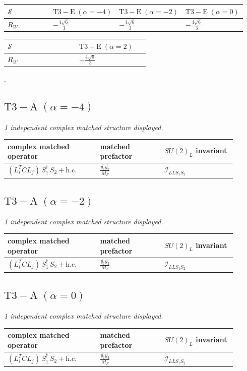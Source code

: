 \documentclass[9pt]{article}
\begin{document}
\begin{longtable}{@{}p{0.37\linewidth}p{0.19\linewidth}p{0.19\linewidth}p{0.19\linewidth}@{}}
\toprule
$\mathcal{S}$ & $ \mathrm{T3-E}\;(\alpha=-4) $ & $ \mathrm{T3-E}\;(\alpha=-2) $ & $ \mathrm{T3-E}\;(\alpha=0) $ \\
\midrule
$R_W$ & $ - \frac{4 \sqrt{6}}{3} $ & $ - \frac{4 \sqrt{6}}{3} $ & $ - \frac{4 \sqrt{6}}{3} $ \\
\bottomrule
\end{longtable}
\begin{longtable}{@{}p{0.37\linewidth}p{0.19\linewidth}@{}}
\toprule
$\mathcal{S}$ & $ \mathrm{T3-E}\;(\alpha=2) $ \\
\midrule
$R_W$ & $ - \frac{4 \sqrt{6}}{3} $ \\
\bottomrule
\end{longtable}
.
\subsection*{$ \mathrm{T3-A}\;(\alpha=-4) $}
\textit{1 independent complex matched structure displayed. }
\begin{longtable}{@{}p{0.36\linewidth}p{0.25\linewidth}p{0.29\linewidth}@{}}
\toprule
complex matched operator & matched prefactor & $SU(2)_L$ invariant \\
\midrule
$ (L_i^T C L_j)\,S_1^\dagger\,S_2+\mathrm{h.c.} $ & $ \frac{\overline{y_{1}} \overline{y_{2}}}{M_F} $ & $ \mathcal{I}_{LLS_1S_2} $ \\
\bottomrule
\end{longtable}
\subsection*{$ \mathrm{T3-A}\;(\alpha=-2) $}
\textit{1 independent complex matched structure displayed. }
\begin{longtable}{@{}p{0.36\linewidth}p{0.25\linewidth}p{0.29\linewidth}@{}}
\toprule
complex matched operator & matched prefactor & $SU(2)_L$ invariant \\
\midrule
$ (L_i^T C L_j)\,S_1^\dagger\,S_2+\mathrm{h.c.} $ & $ \frac{\overline{y_{1}} \overline{y_{2}}}{M_F} $ & $ \mathcal{I}_{LLS_1S_2} $ \\
\bottomrule
\end{longtable}
\subsection*{$ \mathrm{T3-A}\;(\alpha=0) $}
\textit{1 independent complex matched structure displayed. }
\begin{longtable}{@{}p{0.36\linewidth}p{0.25\linewidth}p{0.29\linewidth}@{}}
\toprule
complex matched operator & matched prefactor & $SU(2)_L$ invariant \\
\midrule
$ (L_i^T C L_j)\,S_1^\dagger\,S_2+\mathrm{h.c.} $ & $ \frac{\overline{y_{1}} \overline{y_{2}}}{M_F} $ & $ \mathcal{I}_{LLS_1S_2} $ \\
\bottomrule
\end{longtable}
\end{document}
